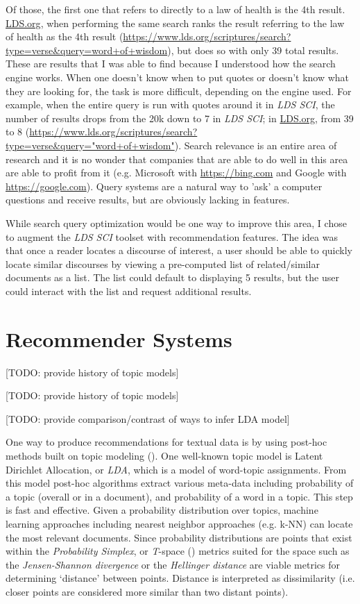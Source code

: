 Of those, the first one that refers to directly to a law of health is the 4th result. \url{LDS.org}, when performing the same search ranks the result referring to the law of health as the 4th result (\url{https://www.lds.org/scriptures/search?type=verse&query=word+of+wisdom}), but does so with only 39 total results. These are results that I was able to find because I understood how the search engine works. When one doesn’t know when to put quotes or doesn’t know what they are looking for, the task is more difficult, depending on the engine used. For example, when the entire query is run with quotes around it in \emph{LDS SCI}, the number of results drops from the 20k down to 7 in \emph{LDS SCI}; in \url{LDS.org}, from 39 to 8 (\url{https://www.lds.org/scriptures/search?type=verse&query="word+of+wisdom"}). Search relevance is an entire area of research and it is no wonder that companies that are able to do well in this area are able to profit from it (e.g. Microsoft with \url{https://bing.com} and Google with \url{https://google.com}). Query systems are a natural way to 'ask' a computer questions and receive results, but are obviously lacking in features.

While search query optimization would be one way to improve this area, I chose to augment the \emph{LDS SCI} toolset with recommendation features. The idea was that once a reader locates a discourse of interest, a user should be able to quickly locate similar discourses by viewing a pre-computed list of related/similar documents as a list. The list could default to displaying 5 results, but the user could interact with the list and request additional results. %


\section{Recommender Systems}

[TODO: provide history of topic models]

[TODO: provide history of topic models]

[TODO: provide comparison/contrast of ways to infer LDA model]

One way to produce recommendations for textual data is by using post-hoc methods built on topic modeling (\citealp{blei2012probabilistic}). One well-known topic model is Latent Dirichlet Allocation, or \emph{LDA}, which is a model of word-topic assignments. From this model post-hoc algorithms extract various meta-data including probability of a topic (overall or in a document), and probability of a word in a topic. This step is fast and effective. Given a probability distribution over topics, machine learning approaches including nearest neighbor approaches (e.g. k-NN) can locate the most relevant documents. Since probability distributions are points that exist within the \emph{Probability Simplex}, or \textit{T}-space (\citealp{Krstovski2013efficient}) metrics suited for the space such as the \emph{Jensen-Shannon divergence} or the \emph{Hellinger distance} are viable metrics for determining `distance' between points. Distance is interpreted as dissimilarity (i.e. closer points are considered more similar than two distant points).

